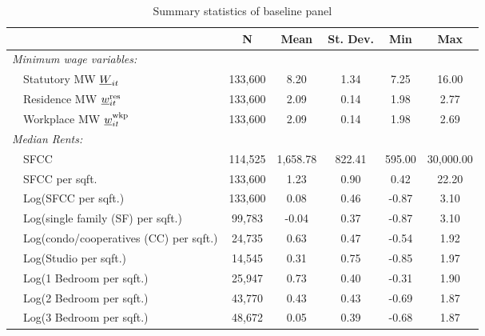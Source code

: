 \begin{table}[hbt!] \centering
    \caption{Summary statistics of baseline panel}
    \label{tab:stats_est_panel}
    \begin{tabular}{@{}lccccc@{}}
        \toprule
                                          & \multicolumn{1}{c}{N} 
                                          & \multicolumn{1}{c}{Mean} 
                                          & \multicolumn{1}{c}{St. Dev.} 
                                          & \multicolumn{1}{c}{Min} 
                                          & \multicolumn{1}{c}{Max}                 \\ \midrule
        \textit{Minimum wage variables:}              &       &       &       &       &       \\
        $\quad$Statutory MW $\underline{W}_{it}$                & 133,600  & 8.20  & 1.34  & 7.25  & 16.00  \\
        $\quad$Residence MW $\underline{w}^{\text{res}}_{it}$         & 133,600  & 2.09  & 0.14  & 1.98  & 2.77  \\
        $\quad$Workplace MW $\underline{w}^{\text{wkp}}_{it}$         & 133,600  & 2.09  & 0.14  & 1.98  & 2.69  \\[.3em]
        \textit{Median Rents:}                        &       &       &       &       &       \\
        $\quad$SFCC                                   & 114,525  & 1,658.78  & 822.41  & 595.00  & 30,000.00  \\
        $\quad$SFCC per sqft.                         & 133,600  & 1.23  & 0.90  & 0.42  & 22.20  \\
        $\quad$Log(SFCC per sqft.)                    & 133,600  & 0.08  & 0.46  & -0.87  & 3.10  \\
        $\quad$Log(single family (SF) per sqft.)      & 99,783  & -0.04  & 0.37  & -0.87  & 3.10  \\
        $\quad$Log(condo/cooperatives (CC) per sqft.) & 24,735  & 0.63  & 0.47  & -0.54  & 1.92  \\
        $\quad$Log(Studio per sqft.)                  & 14,545  & 0.31  & 0.75  & -0.85  & 1.97  \\
        $\quad$Log(1 Bedroom per sqft.)               & 25,947  & 0.73  & 0.40  & -0.31  & 1.90  \\
        $\quad$Log(2 Bedroom per sqft.)               & 43,770  & 0.43  & 0.43  & -0.69  & 1.87  \\
        $\quad$Log(3 Bedroom per sqft.)               & 48,672  & 0.05  & 0.39  & -0.68  & 1.87  \\

\end{tabular}
\end{table}
